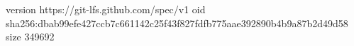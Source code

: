 version https://git-lfs.github.com/spec/v1
oid sha256:dbab99efe427ccb7c661142c25f43f827fdfb775aae392890b4b9a87b2d49d58
size 349692
